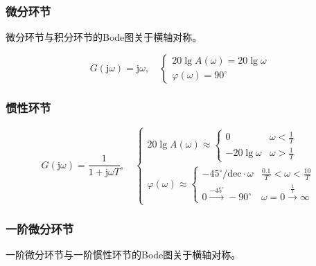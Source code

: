 \documentclass[cn, blue, normal, 12pt]{elegantnote}
\begin{document}
\subsubsection{微分环节}

微分环节与积分环节的Bode图关于横轴对称。

\begin{equation}
    G(\mathrm{j}\omega)=\mathrm{j}\omega, \quad 
    \left\{
        \begin{array}{l}
            20\lg{A(\omega)}=20\lg{\omega} \\
            \varphi(\omega)=90^{\circ}
        \end{array}
    \right.
\end{equation}

\subsubsection{惯性环节}

\begin{equation}
    G(\mathrm{j}\omega)=\frac{1}{1+\mathrm{j}\omega T}, \quad 
    \left\{
        \begin{array}{l}
            20\lg{A(\omega)}\approx\left\{
                \begin{array}{ll}
                    0 & \omega<\frac{1}{T} \\
                    -20\lg{\omega} & \omega>\frac{1}{T}
                \end{array}
            \right. \\
            \varphi(\omega)\approx\left\{
                \begin{array}{ll}
                    -45^{\circ}/\mathrm{dec}\cdot\omega & \frac{0.1}{T}<\omega<\frac{10}{T} \\
                    0 \stackrel{-45^{\circ}}{\rightarrow} -90^{\circ} & \omega=0 \stackrel{\frac{1}{T}}{\rightarrow} \infty
                \end{array}
            \right.
        \end{array}
    \right.
\end{equation}

\subsubsection{一阶微分环节}

一阶微分环节与一阶惯性环节的Bode图关于横轴对称。
\end{document}
